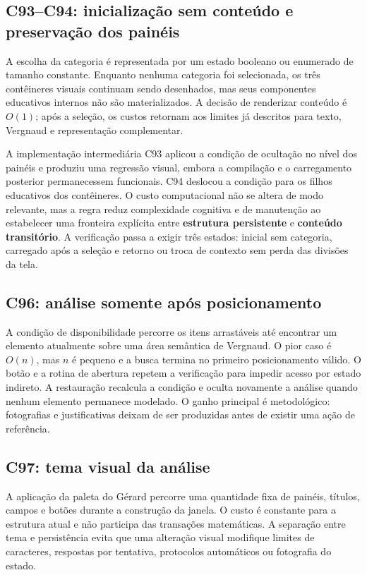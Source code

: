 \documentclass[12pt,a4paper]{article}
\begin{document}
\subsection{C93--C94: inicialização sem conteúdo e preservação dos painéis}
A escolha da categoria é representada por um estado booleano ou enumerado de tamanho constante. Enquanto nenhuma categoria foi selecionada, os três contêineres visuais continuam sendo desenhados, mas seus componentes educativos internos não são materializados. A decisão de renderizar conteúdo é $O(1)$; após a seleção, os custos retornam aos limites já descritos para texto, Vergnaud e representação complementar.

A implementação intermediária C93 aplicou a condição de ocultação no nível dos painéis e produziu uma regressão visual, embora a compilação e o carregamento posterior permanecessem funcionais. C94 deslocou a condição para os filhos educativos dos contêineres. O custo computacional não se altera de modo relevante, mas a regra reduz complexidade cognitiva e de manutenção ao estabelecer uma fronteira explícita entre \textbf{estrutura persistente} e \textbf{conteúdo transitório}. A verificação passa a exigir três estados: inicial sem categoria, carregado após a seleção e retorno ou troca de contexto sem perda das divisões da tela.

\subsection{C96: análise somente após posicionamento}
A condição de disponibilidade percorre os itens arrastáveis até encontrar um elemento atualmente sobre uma área semântica de Vergnaud. O pior caso é $O(n)$, mas $n$ é pequeno e a busca termina no primeiro posicionamento válido. O botão e a rotina de abertura repetem a verificação para impedir acesso por estado indireto. A restauração recalcula a condição e oculta novamente a análise quando nenhum elemento permanece modelado. O ganho principal é metodológico: fotografias e justificativas deixam de ser produzidas antes de existir uma ação de referência.

\subsection{C97: tema visual da análise}
A aplicação da paleta do Gérard percorre uma quantidade fixa de painéis, títulos, campos e botões durante a construção da janela. O custo é constante para a estrutura atual e não participa das transações matemáticas. A separação entre tema e persistência evita que uma alteração visual modifique limites de caracteres, respostas por tentativa, protocolos automáticos ou fotografia do estado.
\end{document}
